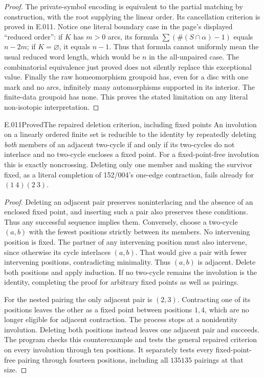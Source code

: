 \begin{proof}
The private-symbol encoding is equivalent to the partial matching by
construction, with the root supplying the linear order. Its cancellation
criterion is proved in E.011. Notice one literal boundary case in the
page's displayed ``reduced order'': if $K$ has $m>0$ arcs, its formula
$\sum(\#(S\cap\alpha)-1)$ equals $n-2m$; if $K=\varnothing$, it equals
$n-1$. Thus that formula cannot uniformly mean the usual reduced word
length, which would be $n$ in the all-unpaired case. The combinatorial
equivalence just proved does not silently replace this exceptional value.
Finally the raw homeomorphism groupoid has, even for a disc with one
mark and no arcs, infinitely many automorphisms supported in its interior.
The finite-data groupoid has none. This proves the stated limitation on
any literal non-isotopic interpretation.
\end{proof}

\begin{saresult}{E.011}{Proved}{The repaired deletion criterion, including fixed points}
An involution on a linearly ordered finite set is reducible to the identity
by repeatedly deleting \emph{both} members of an adjacent two-cycle if
and only if its two-cycles do not interlace and no two-cycle encloses a
fixed point. For a fixed-point-free involution this is exactly
noncrossing. Deleting only one member and making the survivor fixed,
as a literal completion of 152/004's one-edge contraction, fails already
for $(1\ 4)(2\ 3)$.
\end{saresult}
\begin{proof}
Deleting an adjacent pair preserves noninterlacing and the absence of an
enclosed fixed point, and inserting such a pair also preserves these
conditions. Thus any successful sequence implies them. Conversely,
choose a two-cycle $(a,b)$ with the fewest positions strictly between its
members. No intervening position is fixed. The partner of any intervening
position must also intervene, since otherwise its cycle interlaces
$(a,b)$. That would give a pair with fewer intervening positions,
contradicting minimality. Thus $(a,b)$ is adjacent. Delete both positions
and apply induction. If no two-cycle remains the involution is the
identity, completing the proof for arbitrary fixed points as well as
pairings.

For the nested pairing the only adjacent pair is $(2,3)$. Contracting one
of its positions leaves the other as a fixed point between positions
$1,4$, which are no longer eligible for adjacent contraction. The process
stops at a nonidentity involution. Deleting both positions instead leaves
one adjacent pair and succeeds. The program checks this counterexample
and tests the general repaired criterion on every involution through ten
positions. It separately tests every fixed-point-free pairing through
fourteen positions, including all $135135$ pairings at that size.
\end{proof}


